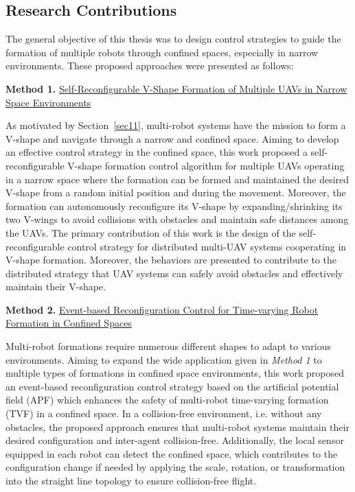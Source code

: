 \subsection{Research Contributions}
The general objective of this thesis was to design control strategies to guide the formation of multiple robots through confined spaces, especially in narrow environments. These proposed approaches were presented as follows:

\noindent \textbf{Method 1.} \hyperref[paper1]{Self-Reconfigurable V-Shape Formation of Multiple UAVs in Narrow Space Environments}

As motivated by Section~\ref{sec11}, multi-robot systems have the mission to form a V-shape and navigate through a narrow and confined space. Aiming to develop an effective control strategy in the confined space, this work proposed a self-reconfigurable V-shape formation control algorithm for multiple UAVs operating in a narrow space where the formation can be formed and maintained the desired V-shape from a random initial position and during the movement. Moreover, the formation can autonomously reconfigure its V-shape by expanding/shrinking its two V-wings to avoid collisions with obstacles and maintain safe distances among the UAVs. The primary contribution of this work is the design of the self-reconfigurable control strategy for distributed multi-UAV systems cooperating in V-shape formation. Moreover, the behaviors are presented to contribute to the distributed strategy that UAV systems can safely avoid obstacles and effectively maintain their V-shape.

\noindent \textbf{Method 2.} \hyperref[paper2]{Event-based Reconfiguration Control for Time-varying Robot Formation in Confined Spaces}

Multi-robot formations require numerous different shapes to adapt to various environments. Aiming to expand the wide application given in \textit{Method 1} to multiple types of formations in confined space environments, this work proposed an event-based reconfiguration control strategy based on the artificial potential field (APF) which enhances the safety of multi-robot time-varying formation (TVF) in a confined space. In a collision-free environment, i.e. without any obstacles, the proposed approach ensures that multi-robot systems maintain their desired configuration and inter-agent collision-free. Additionally, the local sensor equipped in each robot can detect the confined space, which contributes to the configuration change if needed by applying the scale, rotation, or transformation into the straight line topology to ensure collision-free flight.

